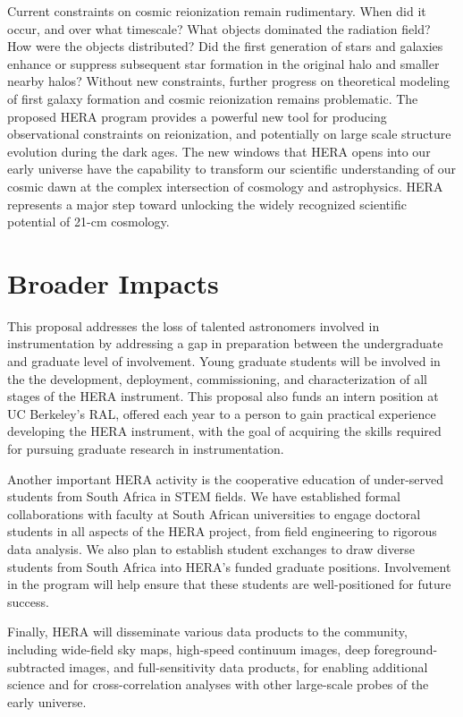 \documentclass[preprint]{aastex}
\begin{document}
Current constraints on cosmic reionization remain rudimentary. When did it
occur, and over what timescale?  What objects dominated the radiation field?
How were the objects distributed? Did the first generation of stars and galaxies
enhance or suppress subsequent star formation in the
original halo and smaller nearby halos? Without new constraints, further
progress on theoretical modeling of first galaxy formation and cosmic
reionization remains problematic.  The proposed HERA program provides a
powerful new tool for producing observational constraints on reionization, and
potentially on large scale structure evolution during the dark ages.  The new
windows that HERA opens into our early universe have the capability to
transform our scientific understanding of our cosmic dawn at the complex intersection of cosmology
and astrophysics.  HERA represents a major step toward unlocking the widely recognized scientific potential of
21-cm cosmology.

\section*{Broader Impacts}

This proposal addresses the loss of talented astronomers involved in
instrumentation by addressing a gap in preparation between the undergraduate
and graduate level of involvement.  Young graduate students will be involved
in the the development,
deployment, commissioning, and characterization of all stages of the HERA
instrument. This proposal also funds an intern
position at UC Berkeley's RAL, offered each year to a person to gain
practical experience developing
the HERA instrument, with the goal of acquiring the skills required for
pursuing graduate research in instrumentation.

Another important HERA activity is the cooperative education of
under-served students from South Africa in STEM fields.
We have established formal collaborations
with faculty at South African universities to engage doctoral students in all aspects of the HERA project, from
field engineering to rigorous data analysis. We also plan to establish
student exchanges to draw
diverse students from South Africa into HERA's funded graduate positions.
Involvement in the
program will help ensure that these students are well-positioned for
future success.

Finally, HERA will disseminate various data products to the community,
including wide-field sky maps, high-speed continuum images, deep
foreground-subtracted images, and full-sensitivity data products, for enabling
additional science and for cross-correlation analyses with other large-scale
probes of the early universe. %
\end{document}
